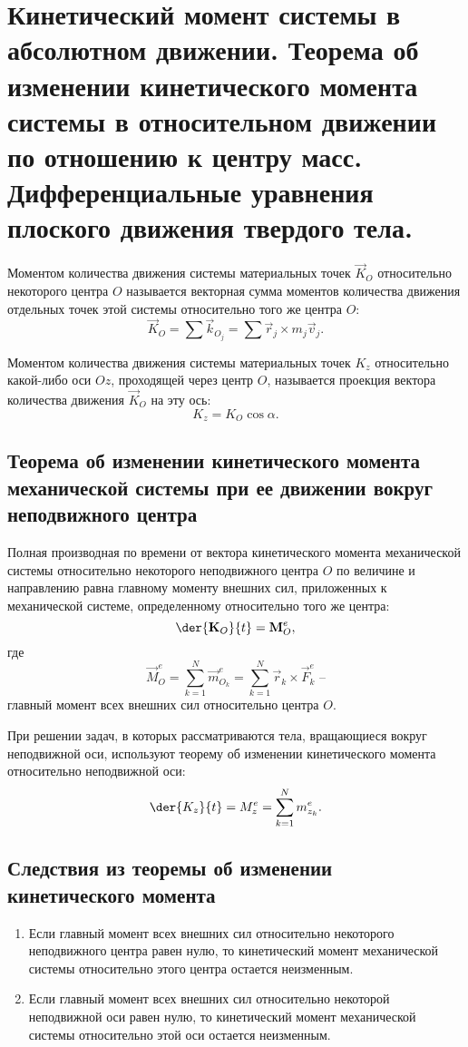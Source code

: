 \chapter{Кинетический момент системы в абсолютном движении. Теорема об
изменении кинетического момента системы в относительном движении по
отношению к центру масс. Дифференциальные уравнения плоского движения
твердого тела.}

Моментом количества движения системы материальных точек \( \vec{K}_O \)
относительно некоторого центра \( O \) называется векторная сумма моментов
количества движения отдельных точек этой системы относительно того же центра
\( O \):
\[
    \vec{K}_O = \sum \vec{k}_{O_j} = \sum \vec{r}_j\times m_j\vec{v}_j.
\]
 
Моментом количества движения системы материальных точек \( K_z \) относительно
какой-либо оси \( Oz \), проходящей через центр \( O \), называется проекция
вектора количества движения \( \vec{K}_O \) на эту ось:
\[
    K_z = K_O\cos\alpha.
\]

\section{Теорема об изменении кинетического момента механической системы при ее
движении вокруг неподвижного центра}
Полная производная по времени от вектора кинетического момента механической
системы относительно некоторого неподвижного центра \( O \) по величине и
направлению равна главному моменту внешних сил, приложенных к механической
системе, определенному относительно того же центра:
\[
    \der{\vec{K}_O}{t} = \vec{M}^e_O,
\]
где
\[
    \vec{M}^e_O = \sum_{k=1}^N \vec{m}^e_{O_k} = 
    \sum_{k=1}^N \vec{r}_k\times\vec{F}^e_k \text{ --}
\]
главный момент всех внешних сил относительно центра \( O \).

При  решении  задач, в которых рассматриваются тела, вращающиеся вокруг
неподвижной оси, используют теорему об изменении кинетического момента
относительно неподвижной оси:
\[
    \der{K_z}{t} = M^e_z = \sum_{k=1}^N m^e_{z_k}.
\]
 
\section{Следствия из теоремы об изменении кинетического момента}
\begin{enumerate}
    \item Если главный момент всех внешних сил относительно некоторого
    неподвижного центра равен нулю, то кинетический момент механической системы
    относительно этого центра остается неизменным.
    \item Если главный момент всех внешних сил относительно некоторой
    неподвижной оси равен нулю, то кинетический момент механической системы
    относительно этой оси остается неизменным.
\end{enumerate}

